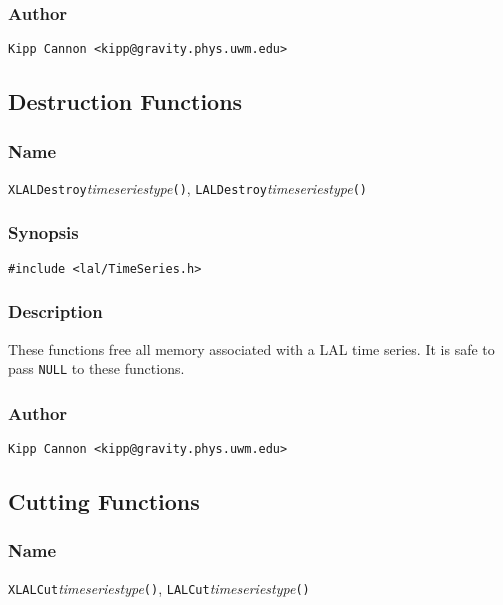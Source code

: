 \subsubsection{Author}

\verb|Kipp Cannon <kipp@gravity.phys.uwm.edu>|


\subsection{Destruction Functions}

\subsubsection{Name}

\texttt{XLALDestroy}\textit{timeseriestype}\texttt{()},
\texttt{LALDestroy}\textit{timeseriestype}\texttt{()}

\subsubsection{Synopsis}

\begin{verbatim}
#include <lal/TimeSeries.h>
\end{verbatim}


\subsubsection{Description}

These functions free all memory associated with a LAL time series.  It is
safe to pass \texttt{NULL} to these functions.

\subsubsection{Author}

\verb|Kipp Cannon <kipp@gravity.phys.uwm.edu>|


\subsection{Cutting Functions}

\subsubsection{Name}

\texttt{XLALCut}\textit{timeseriestype}\texttt{()},
\texttt{LALCut}\textit{timeseriestype}\texttt{()}


